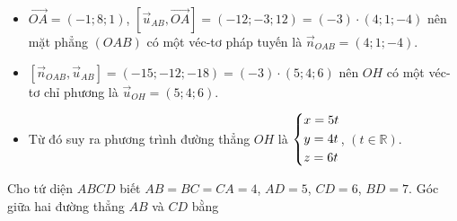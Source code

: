 \begin{ex}
{\begin{itemize}
\item $\vec{OA} = (-1;8;1)$, $\left[ \vec{u}_{AB},\vec{OA} \right]=(-12;-3;12) = (-3) \cdot (4;1;-4)$ nên mặt phẳng $(OAB)$ có một véc-tơ pháp tuyến là $\vec{n}_{OAB}=(4;1;-4)$.
\item $\left[ \vec{n}_{OAB}, \vec{u}_{AB} \right] = (-15;-12;-18) = (-3) \cdot (5;4;6)$ nên $OH$ có một véc-tơ chỉ phương là $\vec{u}_{OH}=(5;4;6)$.
\item Từ đó suy ra phương trình đường thẳng $OH$ là $\left\{\begin{aligned}& x=5t \\& y=4t \\& z=6t\end{aligned}\right.$, $(t \in \mathbb{R})$.
\end{itemize}
}
\end{ex}

\begin{ex}%
Cho tứ diện $ABCD$ biết  $AB=BC=CA=4$, $AD=5$, $CD=6$, $BD=7$. Góc giữa hai đường thẳng $AB$ và $CD$ bằng
\end{ex}

